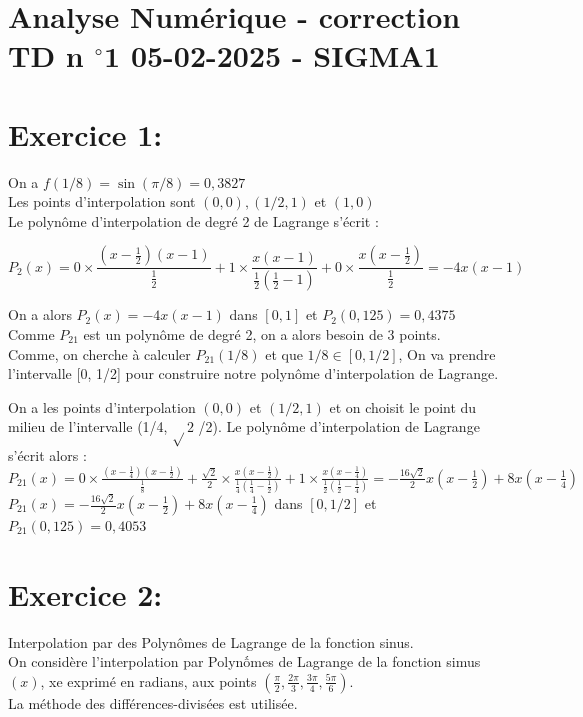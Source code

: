 \documentclass[10pt]{article}
\begin{document}
\section*{Analyse Numérique - correction TD n \({ }^{\circ} \mathbf{1}\) 05-02-2025 - SIGMA1}
\section*{Exercice 1:}
On a \(f(1 / 8)=\sin (\pi / 8)=0,3827\)\\
Les points d'interpolation sont \((0,0),(1 / 2,1)\) et \((1,0)\)\\
Le polynôme d'interpolation de degré 2 de Lagrange s'écrit :

\[
P_{2}(x)=0 \times \frac{\left(x-\frac{1}{2}\right)(x-1)}{\frac{1}{2}}+1 \times \frac{x(x-1)}{\frac{1}{2}\left(\frac{1}{2}-1\right)}+0 \times \frac{x\left(x-\frac{1}{2}\right)}{\frac{1}{2}}=-4 x(x-1)
\]

On a alors \(P_{2}(x)=-4 x(x-1)\) dans \([0,1]\) et \(P_{2}(0,125)=0,4375\)\\
Comme \(P_{21}\) est un polynôme de degré 2, on a alors besoin de 3 points.\\
Comme, on cherche à calculer \(P_{21}(1 / 8)\) et que \(1 / 8 \in[0,1 / 2]\), On va prendre l'intervalle [0, 1/2] pour construire notre polynôme d'interpolation de Lagrange.

On a les points d'interpolation \((0,0)\) et \((1 / 2,1)\) et on choisit le point du milieu de l'intervalle (1/4, \(\sqrt{ } 2\) /2). Le polynôme d'interpolation de Lagrange s'écrit alors :\\
\(P_{21}(x)=0 \times \frac{\left(x-\frac{1}{4}\right)\left(x-\frac{1}{2}\right)}{\frac{1}{8}}+\frac{\sqrt{2}}{2} \times \frac{x\left(x-\frac{1}{2}\right)}{\frac{1}{4}\left(\frac{1}{4}-\frac{1}{2}\right)}+1 \times \frac{x\left(x-\frac{1}{4}\right)}{\frac{1}{2}\left(\frac{1}{2}-\frac{1}{4}\right)}=-\frac{16 \sqrt{2}}{2} x\left(x-\frac{1}{2}\right)+8 x\left(x-\frac{1}{4}\right)\)\\
\(P_{21}(x)=-\frac{16 \sqrt{2}}{2} x\left(x-\frac{1}{2}\right)+8 x\left(x-\frac{1}{4}\right)\) dans \([0,1 / 2]\) et \(P_{21}(0,125)=0,4053\)

\section*{Exercice 2:}
Interpolation par des Polynômes de Lagrange de la fonction sinus.\\
On considère l'interpolation par Polynốmes de Lagrange de la fonction simus \((x)\), xe exprimé en radians, aux points \(\left(\frac{\pi}{2}, \frac{2 \pi}{3}, \frac{3 \pi}{4}, \frac{5 \pi}{6}\right)\).\\
La méthode des différences-divisées est utilisée.
\end{document}

